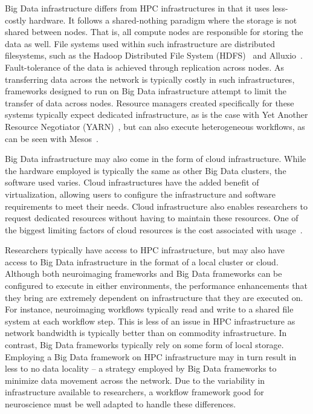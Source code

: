             Big Data infrastructure differs from HPC infrastructures in that it
            uses less-costly hardware. It follows a shared-nothing paradigm
            where the storage is not shared between nodes. That is, all compute
            nodes are responsible for storing the data as well. File systems
            used within such infrastructure are distributed filesystems, such as
            the Hadoop Distributed File System (HDFS)~\cite{5496972} and
            Alluxio~\cite{Li:2014:TRM:2670979.2670985}. Fault-tolerance of the
            data is achieved through replication across nodes. As transferring
            data across the network is typically costly in such infrastructures,
            frameworks designed to run on Big Data infrastructure attempt to
            limit the transfer of data across nodes. Resource managers created
            specifically for these systems typically expect dedicated
            infrastructure, as is the case with Yet Another Resource Negotiator
            (YARN)~\cite{Vavilapalli:2013:AHY:2523616.2523633}, but can also
            execute heterogeneous workflows, as can be seen with
            Mesos~\cite{hindman2011mesos}.

            Big Data infrastructure may also come in the form of cloud
            infrastructure. While the hardware employed is typically the same as
            other Big Data clusters, the software used varies. Cloud
            infrastructures have the added benefit of virtualization, allowing
            users to configure the infrastructure and software requirements to
            meet their needs. Cloud infrastructure also enables researchers to
            request dedicated resources without having to maintain these
            resources. One of the biggest limiting factors of cloud resources is
            the cost associated with usage~\cite{10.3389/fninf.2017.00063}.

            Researchers typically have access to HPC infrastructure, but may
            also have access to Big Data infrastructure in the format of a local
            cluster or cloud. Although both neuroimaging frameworks and Big Data
            frameworks can be configured to execute in either environments, the
            performance enhancements that they bring are extremely dependent on
            infrastructure that they are executed on. For instance, neuroimaging
            workflows typically read and write to a shared file system at each
            workflow step. This is less of an issue in HPC infrastructure as
            network bandwidth is typically better than on commodity
            infrastructure. In contrast, Big Data frameworks typically rely on
            some form of local storage. Employing a Big Data
            framework on HPC infrastructure may in turn result in less to no
            data locality -- a strategy employed by Big Data frameworks to
            minimize data movement across the network. Due to the variability in
            infrastructure available to researchers, a workflow framework good
            for neuroscience must be well adapted to handle these differences.


